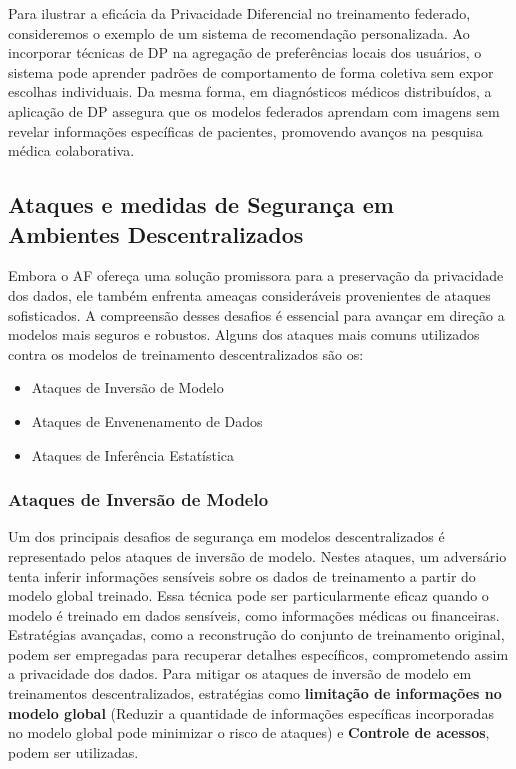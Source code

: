 Para ilustrar a eficácia da Privacidade Diferencial no treinamento federado, consideremos o exemplo de um sistema de recomendação personalizada. Ao incorporar técnicas de DP na agregação de preferências locais dos usuários, o sistema pode aprender padrões de comportamento de forma coletiva sem expor escolhas individuais. Da mesma forma, em diagnósticos médicos distribuídos, a aplicação de DP assegura que os modelos federados aprendam com imagens sem revelar informações específicas de pacientes, promovendo avanços na pesquisa médica colaborativa\cite{shokri2015}.

\subsection{Ataques e medidas de Segurança em Ambientes Descentralizados}

Embora o AF ofereça uma solução promissora para a preservação da privacidade dos dados, ele também enfrenta ameaças consideráveis provenientes de ataques sofisticados. A compreensão desses desafios é essencial para avançar em direção a modelos mais seguros e robustos\cite{geyer2017differentially}. Alguns dos ataques mais comuns utilizados contra os modelos de treinamento descentralizados são os:

\begin{itemize}
    \item Ataques de Inversão de Modelo
    \item Ataques de Envenenamento de Dados
    \item Ataques de Inferência Estatística
\end{itemize}

\subsubsection{Ataques de Inversão de Modelo}

Um dos principais desafios de segurança em modelos descentralizados é representado pelos ataques de inversão de modelo. Nestes ataques, um adversário tenta inferir informações sensíveis sobre os dados de treinamento a partir do modelo global treinado. Essa técnica pode ser particularmente eficaz quando o modelo é treinado em dados sensíveis, como informações médicas ou financeiras. Estratégias avançadas, como a reconstrução do conjunto de treinamento original, podem ser empregadas para recuperar detalhes específicos, comprometendo assim a privacidade dos dados\cite{fredrikson2014privacy}. Para mitigar os ataques de inversão de modelo em treinamentos descentralizados, estratégias como \textbf{limitação de informações no modelo global} (Reduzir a quantidade de informações específicas incorporadas no modelo global pode minimizar o risco de ataques) e \textbf{Controle de acessos}, podem ser utilizadas.

